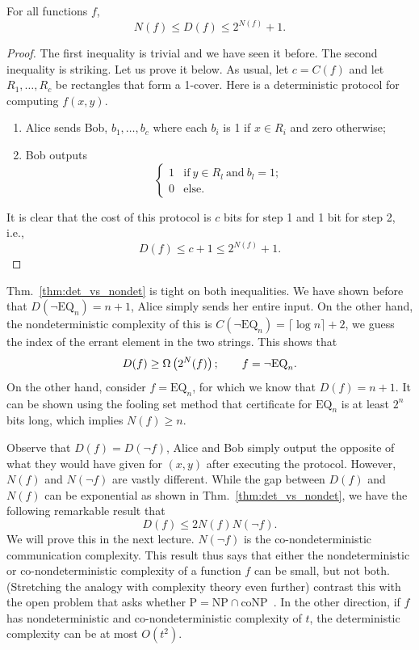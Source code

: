 \documentclass[letterpaper]{article}
\providecommand\rbrac[1]{\ensuremath \left(#1\right)}
\providecommand{\bigo}{O}
\newcommand{\df}{D(f)}
\newcommand{\dnf}{D(\neg f)}
\newcommand{\nf}{N(f)}
\newcommand{\nnf}{N(\neg f)}
\newcommand{\cf}{C(f)}
\newcommand{\EQ}{\mathrm{EQ}}
\newcommand{\nEQ}{\neg \mathrm{EQ}}
\renewcommand{\P}{\mathrm{P}}
\newcommand{\NP}{\mathrm{NP}}
\newcommand{\coNP}{\mathrm{coNP}}
\begin{document}
\begin{theorem}
\label{thm:det_vs_nondet}
For all functions $f$,
$$
\nf \leq \df \leq 2^{\nf} + 1.
$$
\end{theorem}
\begin{proof}
The first inequality is trivial and we have seen it before. The second inequality is striking. Let us prove it below. As usual, let $c = \cf$ and let $R_1, \ldots, R_c$ be rectangles that form a 1-cover. Here is a deterministic protocol for computing $f(x,y)$.
\begin{enumerate}
    \item Alice sends Bob, $b_1, \ldots, b_c$ where each $b_i$ is 1 if $x \in R_i$ and zero otherwise;
    \item Bob outputs
        $$
            \begin{cases}
            1 & \mathrm{if}\ y \in R_l\ \mathrm{and}\ b_l = 1;\\
            0 & \mathrm{else.}
            \end{cases}
         $$
\end{enumerate}
It is clear that the cost of this protocol is $c$ bits for step 1 and 1 bit for step 2, i.e.,
$$
\df \leq c+1 \leq 2^{\nf} + 1.
$$
\end{proof}

\begin{remark}
Thm.~\ref{thm:det_vs_nondet} is tight on both inequalities. We have shown before that $D(\nEQ_n) = n+1$, Alice simply sends her entire input. On the other hand, the nondeterministic complexity of this is $C(\nEQ_n) = \lceil \log n \rceil + 2$, we guess the index of the errant element in the two strings. This shows that
$$
D(f) \geq \Omega \rbrac{2^\nf}; \qquad f = \nEQ_n.
$$
On the other hand, consider $f = \EQ_n$, for which we know that $\df = n+1$. It can be shown using the fooling set method that certificate for $\EQ_n$ is at least $2^n$ bits long, which implies $\nf \geq n$.
\end{remark}

Observe that $\df = \dnf$, Alice and Bob simply output the opposite of what they would have given for $(x,y)$ after executing the protocol. However, $\nf$ and $\nnf$ are vastly different. While the gap between $\df$ and $\nf$ can be exponential as shown in Thm.~\ref{thm:det_vs_nondet}, we have the following remarkable result that
$$
\df \leq 2 \nf \nnf.
$$
We will prove this in the next lecture. $\nnf$ is the co-nondeterministic communication complexity. This result thus says that either the nondeterministic or co-nondeterministic complexity of a function $f$ can be small, but not both. (Stretching the analogy with complexity theory even further) contrast this with the open problem that asks whether $\P = \NP \cap \coNP$~\cite{papadimitriou1984communication}. In the other direction, if $f$ has nondeterministic and co-nondeterministic complexity of $t$, the deterministic complexity can be at most $\bigo(t^2)$.




\end{document}
